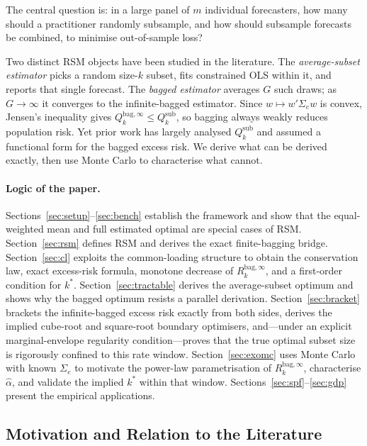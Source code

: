 \documentclass[12pt,a4paper]{article}
\theoremstyle{definition}
\newcommand{\Sig}{\Sigma_e}
\newcommand{\Rk}{R_k^{\mathrm{bag},\infty}}
\begin{document}
The central question is: in a large panel of $m$ individual forecasters,
how many should a practitioner randomly subsample, and how should subsample
forecasts be combined, to minimise out-of-sample loss?

Two distinct RSM objects have been studied in the literature.  The
\emph{average-subset estimator} picks a random size-$k$ subset, fits
constrained OLS within it, and reports that single forecast.  The
\emph{bagged estimator} averages $G$ such draws; as $G\to\infty$ it
converges to the infinite-bagged estimator.  Since $w\mapsto w'\Sig w$ is
convex, Jensen's inequality gives
$Q_k^{\mathrm{bag},\infty}\leq Q_k^{\mathrm{sub}}$,
so bagging always weakly reduces population risk.  Yet prior work has
largely analysed $Q_k^{\mathrm{sub}}$ and assumed a functional form
for the bagged excess risk.  We derive what can be derived exactly, then
use Monte Carlo to characterise what cannot.

\paragraph{Logic of the paper.}
Sections~\ref{sec:setup}--\ref{sec:bench} establish the framework and
show that the equal-weighted mean and full estimated optimal are special
cases of RSM.  Section~\ref{sec:rsm} defines RSM and derives the
exact finite-bagging bridge.  Section~\ref{sec:cl} exploits the
common-loading structure to obtain the conservation law, exact excess-risk
formula, monotone decrease of $\Rk$, and a first-order condition for $k^*$.
Section~\ref{sec:tractable} derives the average-subset optimum and shows
why the bagged optimum resists a parallel derivation.
Section~\ref{sec:bracket} brackets the infinite-bagged excess risk exactly
from both sides, derives the implied cube-root and square-root boundary
optimisers, and---under an explicit marginal-envelope regularity
condition---proves that the true optimal subset size is rigorously confined
to this rate window.  Section~\ref{sec:exomc} uses Monte Carlo with known
$\Sigma_e$ to motivate the power-law parametrisation of $\Rk$, characterise
$\hat\alpha$, and validate the implied $k^*$ within that window.
Sections~\ref{sec:spf}--\ref{sec:gdp} present the empirical applications.

\subsection{Motivation and Relation to the Literature}
\label{sec:motivation}
\end{document}
